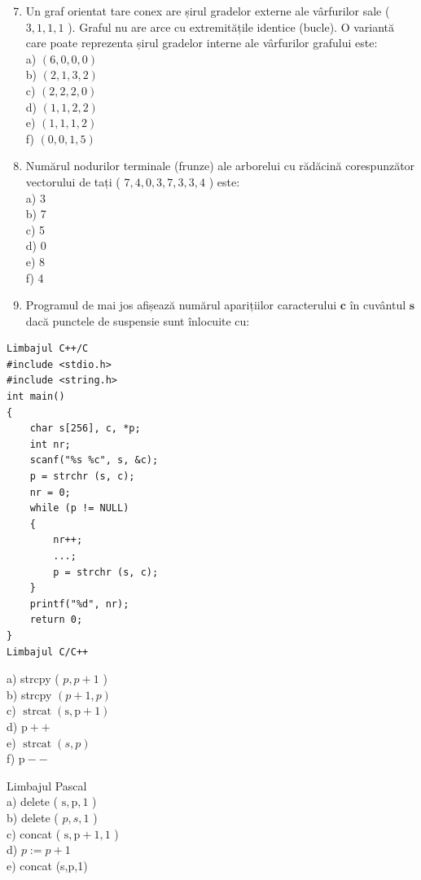\documentclass[10pt]{article}
\begin{document}
\begin{enumerate}
  \setcounter{enumi}{6}
  \item Un graf orientat tare conex are șirul gradelor externe ale vârfurilor sale ( $3,1,1,1$ ). Graful nu are arce cu extremitățile identice (bucle). O variantă care poate reprezenta șirul gradelor interne ale vârfurilor grafului este:\\
a) $(6,0,0,0)$\\
b) $(2,1,3,2)$\\
c) $(2,2,2,0)$\\
d) $(1,1,2,2)$\\
e) $(1,1,1,2)$\\
f) $(0,0,1,5)$
  \item Numărul nodurilor terminale (frunze) ale arborelui cu rădăcină corespunzător vectorului de tați ( $7,4,0,3,7,3,3,4$ ) este:\\
a) 3\\
b) 7\\
c) 5\\
d) 0\\
e) 8\\
f) 4
  \item Programul de mai jos afișează numărul aparițiilor caracterului $\mathbf{c}$ în cuvântul $\mathbf{s}$ dacă punctele de suspensie sunt înlocuite cu:
\end{enumerate}

\begin{verbatim}
Limbajul C++/C
#include <stdio.h>
#include <string.h>
int main()
{
    char s[256], c, *p;
    int nr;
    scanf("%s %c", s, &c);
    p = strchr (s, c);
    nr = 0;
    while (p != NULL)
    {
        nr++;
        ...;
        p = strchr (s, c);
    }
    printf("%d", nr);
    return 0;
}
Limbajul C/C++
\end{verbatim}

a) strcpy ( $p, p+1$ )\\
b) strcpy $(p+1, p)$\\
c) $\operatorname{strcat}(\mathrm{s}, \mathrm{p}+1)$\\
d) $\mathrm{p}++$\\
e) $\operatorname{strcat}(s, p)$\\
f) $\mathrm{p}--$

Limbajul Pascal\\
a) delete ( $\mathrm{s}, \mathrm{p}, 1$ )\\
b) delete ( $p, s, 1$ )\\
c) concat ( $\mathrm{s}, \mathrm{p}+1,1$ )\\
d) $p:=p+1$\\
e) concat (s,p,1)
\end{document}
